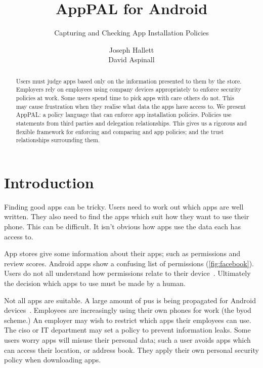 \documentclass[twoside,letterpaper]{soups}
\title{AppPAL for Android}
\subtitle{Capturing and Checking App Installation Policies}
\author{\alignauthor
  Joseph Hallett \\ \email{J.Hallett@sms.ed.ac.uk}
  \alignauthor
  David Aspinall \\ \email{David.Aspinal@ed.ac.uk}}
\newcommand{\comment}[1]{}%
\begin{document}
\maketitle{}

\begin{abstract}
  Users must judge apps based only on the information presented to them by the store.
  Employers rely on employees using company devices appropriately to enforce security policies at work.
  Some users spend time to pick apps with care others do not.
  This may cause frustration when they realise what data the apps have access to.
  We present AppPAL: a policy language that can enforce app installation policies.
  Policies use statements from third parties and delegation relationships.
  This gives us a rigorous and flexible framework for enforcing and comparing and app policies; and the trust relationships surrounding them.
\end{abstract}

\section{Introduction \comment{1 page}}
\label{sec:introduction}

Finding good apps can be tricky.
Users need to work out which apps are well written.
They also need to find the apps which suit how they want to use their phone.
This can be difficult.
It isn't obvious how apps use the data each has access to.

App stores give some information about their apps; such as permissions and review scores.
Android apps show a confusing list of permissions (\autoref{fig:facebook}).
Users do not all understand how permissions relate to their device~\citep{Felt:2012hm,Thompson:2013eb}.
Ultimately the decision which apps to use must be made by a human.

Not all apps are suitable.
A large amount of \ac{pus} is being propagated for Android devices~\citep{Truong:2014bi,Svajcer:2013tp}.
Employees are increasingly using their own phones for work (the \ac{byod} scheme.)
An employer may wish to restrict which apps their employees can use.
The \ac{ciso} or IT department may set a policy to prevent information leaks.
Some users worry apps will misuse their personal data;
  such a user avoids apps which can access their location, or address book.
They apply their own personal security policy when downloading apps.
\end{document}
